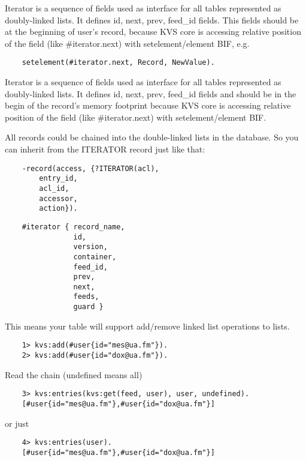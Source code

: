 Iterator is a sequence of fields used as interface for all tables
represented as doubly-linked lists. It defines id, next, prev,
feed\_id fields. This fields should be at the beginning of user's record,
because KVS core is accessing relative position of the
field (like \#iterator.next) with setelement/element BIF, e.g.

\begin{lstlisting}
    setelement(#iterator.next, Record, NewValue).
\end{lstlisting}

Iterator is a sequence of fields used as interface for all tables
represented as doubly-linked lists. It defines id, next, prev, feed\_id fields and
should be in the begin of the record's memory footprint because KVS core is accessing
relative position of the field (like \#iterator.next) with setelement/element BIF.

All records could be chained into the double-linked lists in the database.
So you can inherit from the ITERATOR record just like that:

\begin{lstlisting}
    -record(access, {?ITERATOR(acl),
        entry_id,
        acl_id,
        accessor,
        action}).
\end{lstlisting}

\begin{lstlisting}
    #iterator { record_name,
                id,
                version,
                container,
                feed_id,
                prev,
                next,
                feeds,
                guard }
\end{lstlisting}

This means your table will support add/remove linked list operations to lists.

\begin{lstlisting}
    1> kvs:add(#user{id="mes@ua.fm"}).
    2> kvs:add(#user{id="dox@ua.fm"}).
\end{lstlisting}

Read the chain (undefined means all)

\begin{lstlisting}
    3> kvs:entries(kvs:get(feed, user), user, undefined).
    [#user{id="mes@ua.fm"},#user{id="dox@ua.fm"}]
\end{lstlisting}

or just

\begin{lstlisting}
    4> kvs:entries(user).
    [#user{id="mes@ua.fm"},#user{id="dox@ua.fm"}]
\end{lstlisting}

